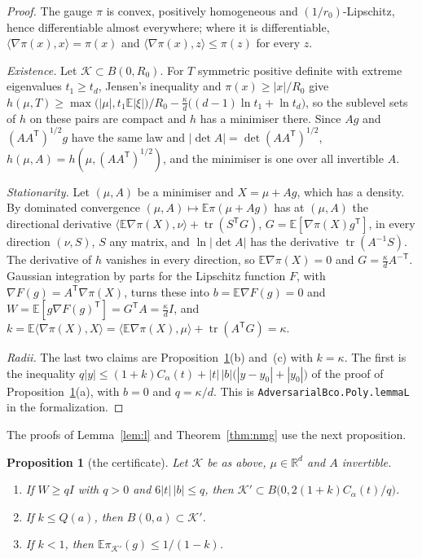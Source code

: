 \documentclass[11pt]{amsart}
\newtheorem{proposition}[theorem]{Proposition}
\theoremstyle{definition}
\numberwithin{equation}{section}
\newcommand{\R}{\mathbb{R}}
\newcommand{\E}{\mathbb{E}}
\newcommand{\cK}{\mathcal{K}}
\newcommand{\tr}{\operatorname{tr}}
\newcommand{\ip}[1]{\langle #1\rangle}
\begin{document}
\begin{proof}
The gauge $\pi$ is convex, positively homogeneous and $(1/r_0)$-Lipschitz, hence differentiable almost everywhere; where it is differentiable, $\ip{\nabla\pi(x),x}=\pi(x)$ and $\ip{\nabla\pi(x),z}\le\pi(z)$ for every $z$.

\emph{Existence.} Let $\cK\subset B(0,R_0)$. For $T$ symmetric positive definite with extreme eigenvalues $t_1\ge t_d$, Jensen's inequality and $\pi(x)\ge|x|/R_0$ give $h(\mu,T)\ge\max\bigl(|\mu|,t_1\E|\xi|\bigr)/R_0-\frac\kappa d\bigl((d-1)\ln t_1+\ln t_d\bigr)$, so the sublevel sets of $h$ on these pairs are compact and $h$ has a minimiser there. Since $Ag$ and $(AA^{\mathsf T})^{1/2}g$ have the same law and $|\det A|=\det(AA^{\mathsf T})^{1/2}$, $h(\mu,A)=h(\mu,(AA^{\mathsf T})^{1/2})$, and the minimiser is one over all invertible $A$.

\emph{Stationarity.} Let $(\mu,A)$ be a minimiser and $X=\mu+Ag$, which has a density. By dominated convergence $(\mu,A)\mapsto\E\pi(\mu+Ag)$ has at $(\mu,A)$ the directional derivative $\ip{\E\nabla\pi(X),\nu}+\tr(S^{\mathsf T}G)$, $G=\E[\nabla\pi(X)g^{\mathsf T}]$, in every direction $(\nu,S)$, $S$ any matrix, and $\ln|\det A|$ has the derivative $\tr(A^{-1}S)$. The derivative of $h$ vanishes in every direction, so $\E\nabla\pi(X)=0$ and $G=\frac\kappa dA^{-\mathsf T}$. Gaussian integration by parts for the Lipschitz function $F$, with $\nabla F(g)=A^{\mathsf T}\nabla\pi(X)$, turns these into $b=\E\nabla F(g)=0$ and $W=\E[g\nabla F(g)^{\mathsf T}]=G^{\mathsf T}A=\frac\kappa dI$, and $k=\E\ip{\nabla\pi(X),X}=\ip{\E\nabla\pi(X),\mu}+\tr(A^{\mathsf T}G)=\kappa$.

\emph{Radii.} The last two claims are Proposition~\ref{prop:cert}(b) and~(c) with $k=\kappa$. The first is the inequality $q|y|\le(1+k)C_\alpha(t)+|t|\,|b|\bigl(|y-y_0|+|y_0|\bigr)$ of the proof of Proposition~\ref{prop:cert}(a), with $b=0$ and $q=\kappa/d$.
This is \texttt{AdversarialBco.Poly.lemmaL} in the formalization.
\end{proof}

The proofs of Lemma~\ref{lem:l} and Theorem~\ref{thm:nmg} use the next proposition.

\begin{proposition}[the certificate]\label{prop:cert}
Let $\cK$ be as above, $\mu\in\R^d$ and $A$ invertible.
\begin{enumerate}[label=(\alph*)]
\item If $W\ge qI$ with $q>0$ and $6|t|\,|b|\le q$, then $\cK'\subset B\bigl(0,2(1+k)C_\alpha(t)/q\bigr)$.
\item If $k\le Q(a)$, then $B(0,a)\subset\cK'$.
\item If $k<1$, then $\E\pi_{\cK'}(g)\le1/(1-k)$.
\end{enumerate}
\end{proposition}
\end{document}
